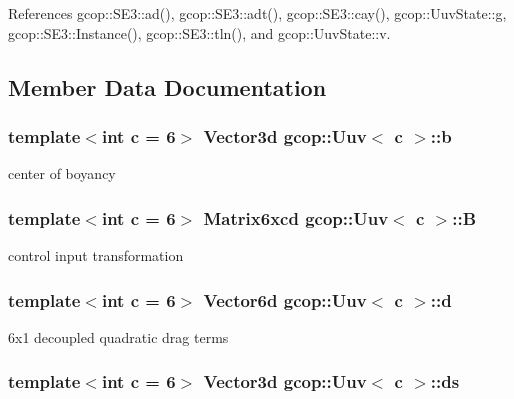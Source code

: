 \-References gcop\-::\-S\-E3\-::ad(), gcop\-::\-S\-E3\-::adt(), gcop\-::\-S\-E3\-::cay(), gcop\-::\-Uuv\-State\-::g, gcop\-::\-S\-E3\-::\-Instance(), gcop\-::\-S\-E3\-::tln(), and gcop\-::\-Uuv\-State\-::v.



\subsection{\-Member \-Data \-Documentation}
\subsubsection[{b}]{\setlength{\rightskip}{0pt plus 5cm}template$<$int c = 6$>$ \-Vector3d {\bf gcop\-::\-Uuv}$<$ c $>$\-::{\bf b}}\label{classgcop_1_1Uuv_a161cadad929d10420e2ff78334680e5a}


center of boyancy 

\subsubsection[{\-B}]{\setlength{\rightskip}{0pt plus 5cm}template$<$int c = 6$>$ \-Matrix6xcd {\bf gcop\-::\-Uuv}$<$ c $>$\-::{\bf \-B}}\label{classgcop_1_1Uuv_a9dad8c4c602ac3d4ea03839446859f4c}


control input transformation 

\subsubsection[{d}]{\setlength{\rightskip}{0pt plus 5cm}template$<$int c = 6$>$ {\bf \-Vector6d} {\bf gcop\-::\-Uuv}$<$ c $>$\-::{\bf d}}\label{classgcop_1_1Uuv_a9b17c2a7df9783c498e41d249866c384}


6x1 decoupled quadratic drag terms 

\subsubsection[{ds}]{\setlength{\rightskip}{0pt plus 5cm}template$<$int c = 6$>$ \-Vector3d {\bf gcop\-::\-Uuv}$<$ c $>$\-::{\bf ds}}\label{classgcop_1_1Uuv_ab86e766a32432302c8aab3ba3b18f1e9}


